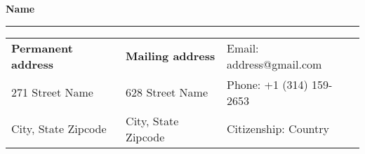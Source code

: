 \documentclass[letterpaper, 10pt]{article}
\begin{document}
\noindent\Large{\textbf{Name}}  \\
\vspace{-2ex}
\hrule
\normalsize

\begin{center}
\begin{tabular}{lll}
\textbf{Permanent address}  & \hspace{0.38in} \textbf{Mailing address}    & \hspace{0.33in} Email: address@gmail.com \\
271 Street Name             & \hspace{0.38in} 628 Street Name             & \hspace{0.33in} Phone: +1 (314) 159-2653 \\
City, State Zipcode         & \hspace{0.38in} City, State Zipcode         & \hspace{0.33in} Citizenship: Country \\
\end{tabular}
\end{center}
\end{document}

